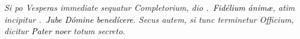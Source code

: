 \documentclass[12pt]{article} %
\newenvironment{rubric}{\vspace{2 mm}\color{benred8} \itshape \leftskip 0in \setlength{\parindent}{0.25in}}{\vspace{2 mm}}
\let\oldVbar\Vbar
\renewcommand{\Vbar}{\textcolor{benred8}{\oldVbar .}}
\begin{document}
\vspace{1.5mm}


\gresetfirstlineaboveinitial{\small \textsc{ \textbf{\textcolor{benred8}{\Vbar}}}}{\small \textsc{ \textbf{\textcolor{benred8}{\Vbar}}}}

\vspace{1.5mm}

\begin{rubric}
Si po Vesperas immediate sequatur Completorium, dio \Vbar\ \emph{\textcolor{black}{Fid\'{e}lium \'{a}nim\ae}}, atim incipitur \Vbar\ \emph{\textcolor{black}{Jube D\'{o}mine bened\'{i}cere}}. Secus autem, si tunc terminetur Officium, dicitur \emph{\textcolor{black}{Pater noer}} totum secreto. %

\end{rubric}







\newpage


\end{document}
